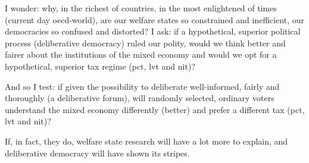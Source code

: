 I wonder:\cite{}
why, in the richest of countries, in the most enlightened of times (current day \gls{oecd}-world), are our welfare states so constrained and inefficient, our democracies so confused and distorted?
I ask:
if a hypothetical, superior political process (deliberative democracy) ruled our polity, would we think better and fairer about the institutions of the mixed economy and would we opt for a hypothetical, superior tax regime (\gls{pct}, \gls{lvt} and \gls{nit})?

And so I test:
if given the possibility to deliberate well-informed, fairly and thoroughly (a deliberative forum), will randomly selected, ordinary voters understand the mixed economy differently (better) and prefer a different tax (\gls{pct}, \gls{lvt} and \gls{nit})?


If, in fact, they do, welfare state research will have a lot more to explain, and deliberative democracy will have shown its stripes.

%

